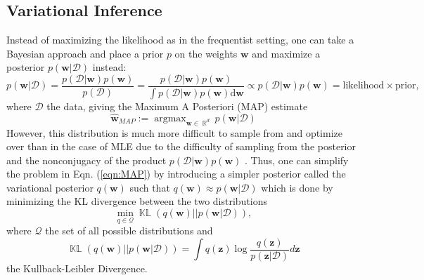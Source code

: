 \documentclass[a4paper, 11pt, oneside]{scrartcl}
\theoremstyle{break}
\DeclareMathOperator*{\argmax}{argmax}
\DeclareMathOperator{\Real}{\mathbb{R}}
\DeclareMathOperator{\KL}{\mathbb{KL}}
\newcommand{\matr}[1]{\boldsymbol{#1}}
\newcommand{\set}[1]{\mathcal{#1}}
\numberwithin{equation}{section}
\begin{document}
		\subsection{Variational Inference}
			Instead of maximizing the likelihood as in the frequentist setting, one can take a Bayesian approach and place a prior $p$ on the weights $\matr{w}$ and maximize a posterior $p(\matr{w} | \set{D})$ instead:
			\begin{equation}
				p(\matr{w} | \set{D}) = \frac{p(\set{D} | \matr{w}) p(\matr{w})}{p(\set{D})} = \frac{p(\set{D} | \matr{w}) p(\matr{w})}{\int p(\set{D} | \matr{w}) p(\matr{w}) \text{d}\matr{w}} \propto p(\set{D} | \matr{w}) p(\matr{w}) = \text{likelihood} \times \text{prior},
				\label{eqn:BayesRule}
			\end{equation}
			where $\set{D}$ the data, giving the Maximum A Posteriori (MAP) estimate
			\begin{equation}
				\matr{\hat{w}}_{MAP} := \argmax_{\matr{w} \in \Real^d} p(\matr{w} | \set{D})
				\label{eqn:MAP}
			\end{equation}
			However, this distribution is much more difficult to sample from and optimize over than in the case of MLE due to the difficulty of sampling from the posterior and the nonconjugacy of the product $p(\set{D} | \matr{w}) p(\matr{w})$ \parencite{KNT+18}.
			Thus, one can simplify the problem in Eqn. (\ref{eqn:MAP}) by introducing a simpler posterior called the variational posterior $q(\matr{w})$ such that $q(\matr{w}) \approx p(\matr{w} | \set{D})$ which is done by minimizing the KL divergence between the two distributions 
			$$\min_{q \in \set{Q}} \KL(q(\matr{w}) || p(\matr{w} | \set{D})),$$
			where $\set{Q}$ the set of all possible distributions and 
			$$\KL(q(\matr{w}) || p(\matr{w} | \set{D})) = \int q(\matr{z}) \log \frac{q(\matr{z})}{p(\matr{z} | \set{D})} d\matr{z}$$
			the Kullback-Leibler Divergence. 
\end{document}
